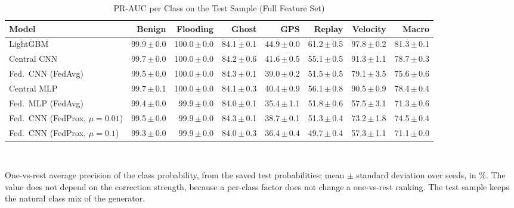 \begin{table}[t]
\centering
\scriptsize
\caption{PR-AUC per Class on the Test Sample (Full Feature Set)}
\label{tab:prauc}
\setlength{\tabcolsep}{3pt}
\begin{tabular}{lrrrrrrr}
\toprule
Model & Benign & Flooding & Ghost & GPS & Replay & Velocity & Macro \\
\midrule
LightGBM & 99.9{\,}$\pm${\,}0.0 & 100.0{\,}$\pm${\,}0.0 & 84.1{\,}$\pm${\,}0.1 & 44.9{\,}$\pm${\,}0.0 & 61.2{\,}$\pm${\,}0.5 & 97.8{\,}$\pm${\,}0.2 & 81.3{\,}$\pm${\,}0.1 \\
Central CNN & 99.7{\,}$\pm${\,}0.0 & 100.0{\,}$\pm${\,}0.0 & 84.2{\,}$\pm${\,}0.6 & 41.6{\,}$\pm${\,}0.5 & 55.1{\,}$\pm${\,}0.5 & 91.3{\,}$\pm${\,}1.1 & 78.7{\,}$\pm${\,}0.3 \\
Fed.\ CNN (FedAvg) & 99.5{\,}$\pm${\,}0.0 & 100.0{\,}$\pm${\,}0.0 & 84.3{\,}$\pm${\,}0.1 & 39.0{\,}$\pm${\,}0.2 & 51.5{\,}$\pm${\,}0.5 & 79.1{\,}$\pm${\,}3.5 & 75.6{\,}$\pm${\,}0.6 \\
Central MLP & 99.7{\,}$\pm${\,}0.1 & 100.0{\,}$\pm${\,}0.0 & 84.1{\,}$\pm${\,}0.3 & 40.4{\,}$\pm${\,}0.9 & 56.1{\,}$\pm${\,}0.8 & 90.5{\,}$\pm${\,}0.9 & 78.4{\,}$\pm${\,}0.4 \\
Fed.\ MLP (FedAvg) & 99.4{\,}$\pm${\,}0.0 & 99.9{\,}$\pm${\,}0.0 & 84.0{\,}$\pm${\,}0.1 & 35.4{\,}$\pm${\,}1.1 & 51.8{\,}$\pm${\,}0.6 & 57.5{\,}$\pm${\,}3.1 & 71.3{\,}$\pm${\,}0.6 \\
Fed.\ CNN (FedProx, $\mu=0.01$) & 99.5{\,}$\pm${\,}0.0 & 99.9{\,}$\pm${\,}0.0 & 84.3{\,}$\pm${\,}0.1 & 38.7{\,}$\pm${\,}0.1 & 51.3{\,}$\pm${\,}0.4 & 73.2{\,}$\pm${\,}1.8 & 74.5{\,}$\pm${\,}0.4 \\
Fed.\ CNN (FedProx, $\mu=0.1$) & 99.3{\,}$\pm${\,}0.0 & 99.9{\,}$\pm${\,}0.0 & 84.0{\,}$\pm${\,}0.3 & 36.4{\,}$\pm${\,}0.4 & 49.7{\,}$\pm${\,}0.4 & 57.3{\,}$\pm${\,}1.1 & 71.1{\,}$\pm${\,}0.0 \\
\bottomrule
\end{tabular}
\\[2pt]
\parbox{\linewidth}{\scriptsize One-vs-rest average precision of the class probability, from the saved test probabilities; mean $\pm$ standard deviation over seeds, in \%. The value does not depend on the correction strength, because a per-class factor does not change a one-vs-rest ranking. The test sample keeps the natural class mix of the generator.}
\end{table}

